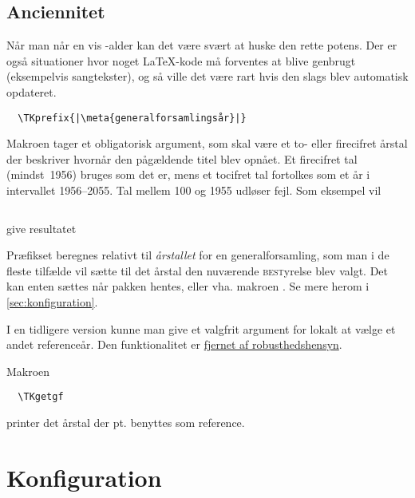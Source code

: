 \documentclass[a4paper,article,oneside,danish]{memoir}
\newenvironment{resultat}{%
  \begin{adjustwidth}{15mm}{15mm}%
    \begin{qshade}%
    }{%
    \end{qshade}%
  \end{adjustwidth}}
\begin{document}

\subsection{Anciennitet}
\label{sec:anciennitet}

Når man når en vis \TK-alder kan det være svært at huske den rette
potens. Der er også situationer hvor noget \LaTeX-kode må forventes at
blive genbrugt (eksempelvis sangtekster), og så ville det være rart
hvis den slags blev automatisk opdateret.

\begin{verbatim}
  \TKprefix{|\meta{generalforsamlingsår}|}
\end{verbatim}

Makroen  tager et obligatorisk argument, som skal være et
to- eller firecifret årstal der beskriver hvornår den pågældende titel
blev opnået. Et firecifret tal (mindst~1956) bruges som det er, mens
et tocifret tal fortolkes som et år i intervallet 1956--2055. Tal
mellem 100 og 1955 udløser fejl. Som eksempel vil

\inputminted{latex}{eksempel-prefix1.tex}
give resultatet

\begin{resultat}

\end{resultat}

Præfikset beregnes relativt til \emph{årstallet} for en
generalforsamling, som man i de fleste tilfælde vil sætte til det
årstal den nuværende \textsc{best}yrelse blev valgt. Det kan enten
sættes når pakken hentes, eller vha. makroen . Se mere
herom i \vref{sec:konfiguration}.

I en tidligere version kunne man give  et valgfrit
argument for lokalt at vælge et andet referenceår. Den funktionalitet
er \hyperref[sec:-og-]{fjernet af robusthedshensyn}.

Makroen
\begin{verbatim}
  \TKgetgf
\end{verbatim}
printer det årstal der pt. benyttes som reference.


\section{Konfiguration}
\label{sec:konfiguration}
\end{document}
